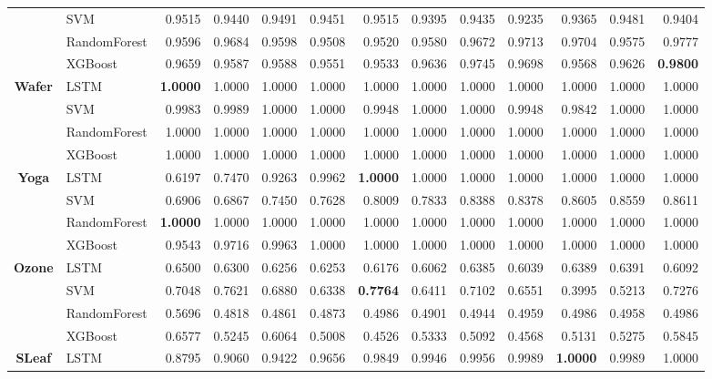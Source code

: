 \begin{table}[h]
\begin{adjustbox}{max width=15cm}
\begin{tabular}{|c|l|r|r|r|r|r|r|r|r|r|r|r|}
	& SVM &  0.9515 &  0.9440 &  0.9491 &  0.9451 &  0.9515 &  0.9395 &  0.9435 &  0.9235 &  0.9365 &  0.9481 &  0.9404 \\
	& RandomForest &  0.9596 &  0.9684 &  0.9598 &  0.9508 &  0.9520 &  0.9580 &  0.9672 &  0.9713 &  0.9704 &  0.9575 &  0.9777 \\
	& XGBoost &  0.9659 &  0.9587 &  0.9588 &  0.9551 &  0.9533 &  0.9636 &  0.9745 &  0.9698 &  0.9568 &  0.9626 &  \textbf{0.9800} \\
	\hline
	\textbf{Wafer} & LSTM &  \textbf{1.0000} &  1.0000 &  1.0000 &  1.0000 &  1.0000 &  1.0000 &  1.0000 &  1.0000 &  1.0000 &  1.0000 &  1.0000 \\
	& SVM &  0.9983 &  0.9989 &  1.0000 &  1.0000 &  0.9948 &  1.0000 &  1.0000 &  0.9948 &  0.9842 &  1.0000 &  1.0000 \\
	& RandomForest &  1.0000 &  1.0000 &  1.0000 &  1.0000 &  1.0000 &  1.0000 &  1.0000 &  1.0000 &  1.0000 &  1.0000 &  1.0000 \\
	& XGBoost &  1.0000 &  1.0000 &  1.0000 &  1.0000 &  1.0000 &  1.0000 &  1.0000 &  1.0000 &  1.0000 &  1.0000 &  1.0000 \\
	\hline
	\textbf{Yoga} & LSTM &  0.6197 &  0.7470 &  0.9263 &  0.9962 &  \textbf{1.0000} &  1.0000 &  1.0000 &  1.0000 &  1.0000 &  1.0000 &  1.0000 \\
	& SVM &  0.6906 &  0.6867 &  0.7450 &  0.7628 &  0.8009 &  0.7833 &  0.8388 &  0.8378 &  0.8605 &  0.8559 &  0.8611 \\
	& RandomForest &  \textbf{1.0000} &  1.0000 &  1.0000 &  1.0000 &  1.0000 &  1.0000 &  1.0000 &  1.0000 &  1.0000 &  1.0000 &  1.0000 \\
	& XGBoost &  0.9543 &  0.9716 &  0.9963 &  1.0000 &  1.0000 &  1.0000 &  1.0000 &  1.0000 &  1.0000 &  1.0000 &  1.0000 \\
	\hline
	\textbf{Ozone} & LSTM &  0.6500 &  0.6300 &  0.6256 &  0.6253 &  0.6176 &  0.6062 &  0.6385 &  0.6039 &  0.6389 &  0.6391 &  0.6092 \\
	& SVM &  0.7048 &  0.7621 &  0.6880 &  0.6338 &  \textbf{0.7764} &  0.6411 &  0.7102 &  0.6551 &  0.3995 &  0.5213 &  0.7276 \\
	& RandomForest &  0.5696 &  0.4818 &  0.4861 &  0.4873 &  0.4986 &  0.4901 &  0.4944 &  0.4959 &  0.4986 &  0.4958 &  0.4986 \\
	& XGBoost &  0.6577 &  0.5245 &  0.6064 &  0.5008 &  0.4526 &  0.5333 &  0.5092 &  0.4568 &  0.5131 &  0.5275 &  0.5845 \\
	\hline
	\textbf{SLeaf} & LSTM &  0.8795 &  0.9060 &  0.9422 &  0.9656 &  0.9849 &  0.9946 &  0.9956 &  0.9989 &  \textbf{1.0000} &  0.9989 &  1.0000 \\

\end{tabular}
\end{adjustbox}
\end{table}
